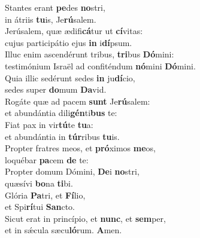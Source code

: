 \evenverse Stantes erant \textbf{pe}des \textbf{no}stri,~\*\\
\evenverse in átriis \textbf{tu}is, Je\textbf{rú}salem.\\
\oddverse Jerúsalem, quæ ædifi\textbf{cá}tur ut \textbf{cí}vitas:~\*\\
\oddverse cujus participátio ejus \textbf{in} i\textbf{dí}psum.\\
\evenverse Illuc enim ascendérunt tribus, \textbf{tri}bus \textbf{Dó}mini:~\*\\
\evenverse testimónium Israël ad confiténdum \textbf{nó}mini \textbf{Dó}mini.\\
\oddverse Quia illic sedérunt sedes \textbf{in} ju\textbf{dí}cio,~\*\\
\oddverse sedes super \textbf{do}mum \textbf{Da}vid.\\
\evenverse Rogáte quæ ad pacem \textbf{sunt} Je\textbf{rú}salem:~\*\\
\evenverse et abundántia dili\textbf{gén}ti\textbf{bus} te:\\
\oddverse Fiat pax in vir\textbf{tú}te \textbf{tu}a:~\*\\
\oddverse et abundántia in \textbf{túr}ribus \textbf{tu}is.\\
\evenverse Propter fratres meos, et \textbf{pró}ximos \textbf{me}os,~\*\\
\evenverse loquébar \textbf{pa}cem \textbf{de} te:\\
\oddverse Propter domum Dómini, \textbf{De}i \textbf{no}stri,~\*\\
\oddverse quæsívi \textbf{bo}na \textbf{ti}bi.\\
\evenverse Glória \textbf{Pa}tri, et \textbf{Fí}lio,~\*\\
\evenverse et Spi\textbf{rí}tui \textbf{San}cto.\\
\oddverse Sicut erat in princípio, et \textbf{nunc}, et \textbf{sem}per,~\*\\
\oddverse et in sǽcula sæcu\textbf{ló}rum. \textbf{A}men.\\
